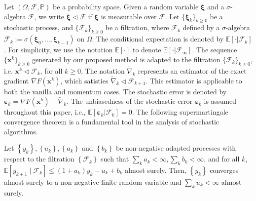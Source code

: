 \documentclass[twoside,11pt]{article}
\newcommand{\E}{\mathbb{E}}
\newcommand{\cF}{\mathcal F}
\newcommand{\wtnabla}{\widetilde\nabla}
\def\vx{{\bm{x}}}
\begin{document}
Let $(\Omega,\cF,\mathbb P)$ be a  probability space. Given a random variable ${\bm\xi}$ and a $\sigma$-algebra $\cF$, we write ${\bm\xi}\vartriangleleft\cF$ if ${\bm\xi}$ is measurable over $\cF$. {Let $\{{\bm\xi}_k\}_{k\geq0}$ be a stochastic process, and $\{\cF_k\}_{k\geq0}$ be a filtration, where $\cF_k$ defined by a $\sigma$-algebra $\cF_k:=\sigma(\bm\xi_0, \ldots, \bm\xi_{k-1}) $ on $\Omega$. The conditional expectation is denoted by $\E[\cdot|\cF_k]$.  For simplicity, we use the notation  $\E[\cdot]$ to denote $\E[\cdot|\cF_{\infty}]$. The sequence $\{\vx^k\}_{k\geq0}$ generated by our proposed method is adapted to the filtration $\{\cF_k\}_{k\geq0}$, i.e. $\vx^k\vartriangleleft\cF_k$, for all $k\geq0$. The notation $\wtnabla_k$ represents an estimator of the exact gradient $\nabla F(\vx^k)$, which satisties $\widetilde\nabla_k\vartriangleleft\cF_{k+1}$. This estimator is applicable to both the vanilla and momentum cases. The stochastic error is denoted by ${\bm\varepsilon}_k=\nabla F(\vx^k)-\wtnabla_k$. The unbiasedness of the stochastic error {$\bm{\varepsilon}_k$} is assumed throughout this paper, i.e., $\E[{\bm\varepsilon}_k|\cF_{k}]=0$.}
The following supermartingale convergence theorem is a fundamental tool in the analysis of stochastic algorithms.
\begin{theorem} \citep{robbins1951stochastic}
Let $\left\{y_k\right\},\left\{u_k\right\},\left\{a_k\right\}$ and $\left\{b_k\right\}$ be non-negative adapted processes with respect to the filtration $\left\{\mathcal{F}_k\right\}$ such that $\sum_k a_k<\infty, \sum_k b_k<\infty$, and for all $k$, $\mathbb{E}\left[y_{k+1} \mid \mathcal{F}_k\right] \leq\left(1+a_k\right) y_k-u_k+b_k$ almost surely. Then, $\left\{y_k\right\}$ converges almost surely to a non-negative finite random variable and $\sum_k u_k<\infty$ almost surely.
\label{martingale-convergence}
\end{theorem}
\end{document}
